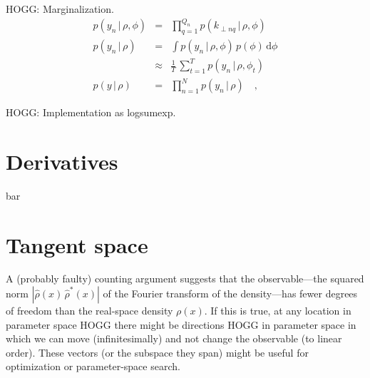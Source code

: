 \documentclass[12pt]{article}
\newcommand{\given}{\,|\,}
\newcommand{\dd}{\mathrm{d}}
\begin{document}
HOGG: Marginalization.
\begin{eqnarray}
  p(y_n\given\rho,\phi) &=& \prod_{q=1}^{Q_n} p(k_{\perp nq}\given\rho,\phi)
  \\
  p(y_n\given\rho) &=& \int p(y_n\given\rho,\phi)\,p(\phi)\,\dd\phi
  \\
  &\approx& \frac{1}{T}\,\sum_{t=1}^T p(y_n\given\rho,\phi_t)
  \\
  p(y\given\rho) &=& \prod_{n=1}^N p(y_n\given\rho)
  \quad,
\end{eqnarray}

HOGG: Implementation as logsumexp.

\section{Derivatives}

bar

\section{Tangent space}

A (probably faulty) counting argument suggests that the
observable---the squared norm $|\hat{\rho}(x)\,\hat{\rho}^{\ast}(x)|$
of the Fourier transform of the density---has fewer degrees of freedom
than the real-space density $\rho(x)$.
If this is true, at any location in parameter space HOGG there might
be directions HOGG in parameter space in which we can move
(infinitesimally) and not change the observable (to linear order).
These vectors (or the subspace they span) might be useful for
optimization or parameter-space search.
\end{document}
